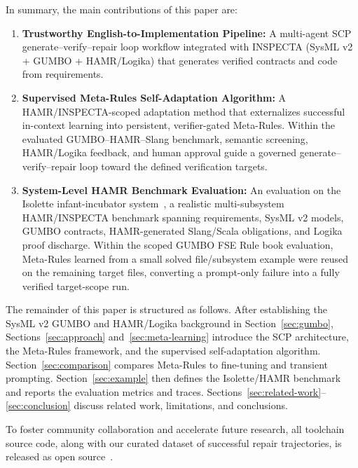 \documentclass[conference]{IEEEtran}
\begin{document}
In summary, the main contributions of this paper are:
\begin{enumerate}
    \item \textbf{Trustworthy English-to-Implementation Pipeline:} A multi-agent SCP generate--verify--repair loop workflow integrated with INSPECTA (SysML v2 + GUMBO + HAMR/Logika) that generates verified contracts and code from requirements.
    \item \textbf{Supervised Meta-Rules Self-Adaptation Algorithm:} A HAMR/INSPECTA-scoped adaptation method that externalizes successful in-context learning into persistent, verifier-gated Meta-Rules. Within the evaluated GUMBO--HAMR--Slang benchmark, semantic screening, HAMR/Logika feedback, and human approval guide a governed generate--verify--repair loop toward the defined verification targets.
    \item \textbf{System-Level HAMR Benchmark Evaluation:} An evaluation on the Isolette infant-incubator system~\cite{hatcliff2024isolette}, a realistic multi-subsystem HAMR/INSPECTA benchmark spanning requirements, SysML v2 models, GUMBO contracts, HAMR-generated Slang/Scala obligations, and Logika proof discharge. Within the scoped GUMBO FSE Rule book evaluation, Meta-Rules learned from a small solved file/subsystem example were reused on the remaining target files, converting a prompt-only failure into a fully verified target-scope run.
\end{enumerate}

The remainder of this paper is structured as follows. After establishing the SysML v2 GUMBO and HAMR/Logika background in Section~\ref{sec:gumbo}, Sections~\ref{sec:approach} and~\ref{sec:meta-learning} introduce the SCP architecture, the Meta-Rules framework, and the supervised self-adaptation algorithm. Section~\ref{sec:comparison} compares Meta-Rules to fine-tuning and transient prompting. Section~\ref{sec:example} then defines the Isolette/HAMR benchmark and reports the evaluation metrics and traces. Sections~\ref{sec:related-work}--\ref{sec:conclusion} discuss related work, limitations, and conclusions.

To foster community collaboration and accelerate future research, all toolchain source code, along with our curated dataset of successful repair trajectories, is released as open source~\cite{inspecta_repo}.%

\end{document}
